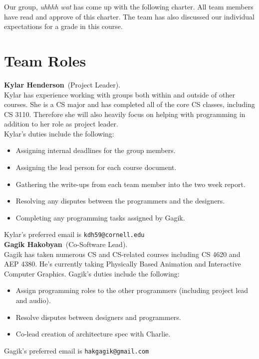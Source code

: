 \documentclass[letterpaper,11pt]{texMemo} %
\newcommand{\teamname}{uhhhh wat}
\newcommand{\teammember}[2]{ \textbf{#1}\ (#2).\ }
\newenvironment{duties}[1]
               {
                 #1's duties include the following:
                 \begin{itemize}
               }
               {
                 \end{itemize}
               }
\newcommand{\preferredemail}[2]{#1's preferred email is \texttt{#2}\\}
\begin{document}
\maketitle %


Our group, \textit{\teamname} has come up with the following charter.
All team members have read and approve of this charter. The team has also
discussed our individual expectations for a grade in this course.

\section*{Team Roles}

\teammember{Kylar Henderson}{Project Leader}\\Kylar has experience working with groups both within and outside of other courses. She is a CS major and has completed all of the core CS classes, including CS 3110. Therefore she will also heavily focus on helping with programming in addition to her role as project leader.\\
\begin{duties}{Kylar}
  \item Assigning internal deadlines for the group members.
  \item Assigning the lead person for each course document.
  \item Gathering the write-ups from each team member into the two week report. 
  \item Resolving any disputes between the programmers and the designers.
  \item Completing any programming tasks assigned by Gagik.
\end{duties}
\preferredemail{Kylar}{kdh59@cornell.edu}

\teammember{Gagik Hakobyan}{Co-Software Lead}\\Gagik has taken numerous CS and CS-related courses including CS 4620 and AEP 4380.  He’s currently taking Physically Based Animation and Interactive Computer Graphics.
\begin{duties}{Gagik}
\item Assign programming roles to the other programmers (including project lead and audio).
\item Resolve disputes between designers and programmers.
\item Co-lead creation of architecture spec with Charlie.
\end{duties}
\preferredemail{Gagik}{hakgagik@gmail.com}
\end{document}
